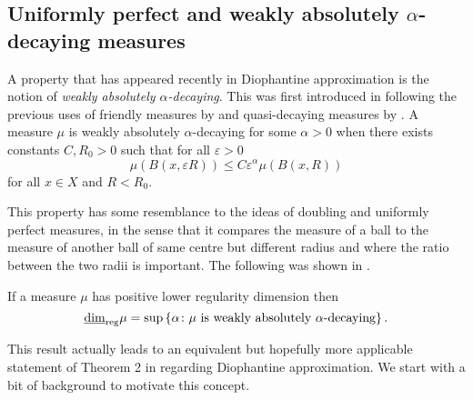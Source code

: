 \subsection{Uniformly perfect and weakly absolutely $\alpha$-decaying measures}\label{ch-quantifying:sec:diophantine}

A property that has appeared recently in Diophantine approximation is the notion of \textit{weakly absolutely $\alpha$-decaying}. This was first introduced in \cite{beres-sanju-al} following the previous uses of friendly measures by \cite{friendly} and quasi-decaying measures by \cite{decaying1, decaying2}. A measure $\mu$ is weakly absolutely $\alpha$-decaying for some $\alpha > 0$ when there exists constants $C, R_0 >0$ such that for all $\varepsilon > 0$
\[
\mu(B(x,\varepsilon R)) \le C \varepsilon^{\alpha} \mu(B(x,R))
\]
for all $x \in X$ and $R<R_0$.

This property has some resemblance to the ideas of doubling and uniformly perfect measures, in the sense that it compares the measure of a ball to the measure of another ball of same centre but different radius and where the ratio between the two radii is important. The following was shown in \cite{howroyd}.
\begin{proposition}\label{ch-quantifying:equiv-diophantine}
	If a measure $\mu$ has positive lower regularity dimension then 
	\[
	\underline{\dim}_{\textup{reg}} \mu = \sup\left\{\alpha \colon \mu \text{ is weakly absolutely $\alpha$-decaying}\right\}.
	\]
\end{proposition}

This result actually leads to an equivalent but hopefully more applicable statement of Theorem 2 in \cite{beres-sanju-al} regarding Diophantine approximation. We start with a bit of background to motivate this concept.

